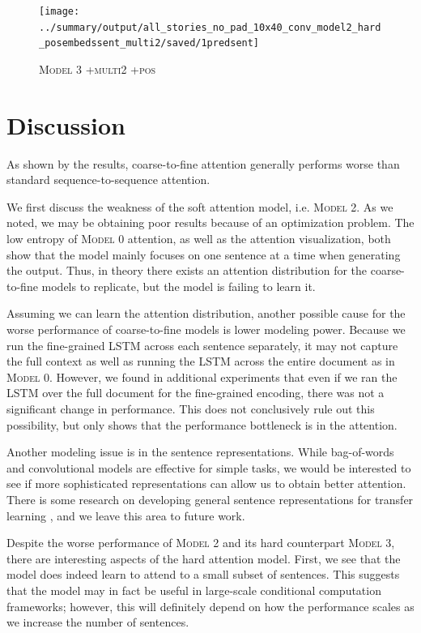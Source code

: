 \documentclass[12pt]{report}
\begin{document}
\begin{figure}[p]
\centering
\texttt{[image: ../summary/output/all\_stories\_no\_pad\_10x40\_conv\_model2\_hard\_posembedssent\_multi2/saved/1predsent]}
\caption[\textsc{Model 3 +multi2 +pos} Attention]{\textsc{Model 3 +multi2 +pos}}
\label{fig:last_attn}
\end{figure}



\chapter{Discussion}
\label{chap:discussion}

As shown by the results, coarse-to-fine attention generally performs worse than standard sequence-to-sequence attention.

We first discuss the weakness of the soft attention model, i.e. \textsc{Model 2}. As we noted, we may be obtaining poor results because of an optimization problem. The low entropy of \textsc{Model 0} attention, as well as the attention visualization, both show that the model mainly focuses on one sentence at a time when generating the output. Thus, in theory there exists an attention distribution for the coarse-to-fine models to replicate, but the model is failing to learn it.

Assuming we can learn the attention distribution, another possible cause for the worse performance of coarse-to-fine models is lower modeling power. Because we run the fine-grained LSTM across each sentence separately, it may not capture the full context as well as running the LSTM across the entire document as in \textsc{Model 0}.
However, we found in additional experiments that even if we ran the LSTM over the full document for the fine-grained encoding, there was not a significant change in performance. This does not conclusively rule out this possibility, but only shows that the performance bottleneck is in the attention.

Another modeling issue is in the sentence representations. While bag-of-words and convolutional models are effective for simple tasks, we would be interested to see if more sophisticated representations can allow us to obtain better attention. There is some research on developing general sentence representations for transfer learning \citep{Bowman2015}, and we leave this area to future work.


Despite the worse performance of \textsc{Model 2} and its hard counterpart \textsc{Model 3}, there are interesting aspects of the hard attention model. First, we see that the model does indeed learn to attend to a small subset of sentences. This suggests that the model may in fact be useful in large-scale conditional computation frameworks; however, this will definitely depend on how the performance scales as we increase the number of sentences.
\end{document}
